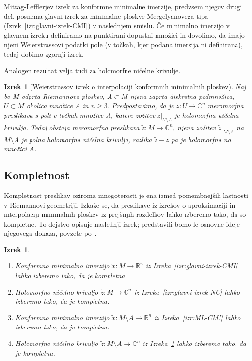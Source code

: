 \documentclass[12pt,a4paper,twoside]{article}
\theoremstyle{definition} %
\theoremstyle{plain} %
\newtheorem{izrek}[definicija]{Izrek}
\numberwithin{equation}{section}  %
\newcommand{\R}{\mathbb R}
\newcommand{\C}{\mathbb C}
\begin{document}
Mittag-Lefflerjev izrek za konformne minimalne imerzije, predvsem njegov drugi del, posnema glavni izrek za minimalne ploskve Mergelyanovega tipa (Izrek~\ref{izr:glavni-izrek-CMI}) v naslednjem smislu. Če minimalno imerzijo v glavnem izreku definiramo na punktirani dopustni množici in dovolimo, da imajo njeni Weierstrassovi podatki pole (v točkah, kjer podana imerzija ni definirana), tedaj dobimo zgornji izrek.

Analogen rezultat velja tudi za holomorfne ničelne krivulje.

\begin{izrek} [Weierstrassov izrek o interpolaciji konformnih minimalnih ploskev] \label{izr:Weierstrass-CMI}
Naj bo $M$ odprta Riemannova ploskev, $A \subset M$ njena zaprta diskretna podmnožica, $U \subset M$ okolica množice $A$ in $n \geq 3$.
Predpostavimo, da je $z \colon U \to \C^{n}$ meromorfna preslikava s poli v točkah množice $A$, katere zožitev $z|_{U \setminus A}$ je holomorfna ničelna krivulja.
Tedaj obstaja meromorfna preslikava $\tilde{z} \colon M \to \C^{n}$, njena zožitev $\tilde{z}|_{M \setminus A}$ na $M \setminus A$ je polna holomorfna ničelna krivulja, razlika $\tilde{z}-z$ pa je holomorfna na množici $A$.
\end{izrek}

\subsection{Kompletnost}
%
Kompletnost preslikav oziroma mnogoterosti je ena izmed pomembnejših lastnosti v Riemannovi geometriji. Izkaže se, da preslikave iz izrekov o aproksimaciji in interpolaciji minimalnih ploskev iz prejšnjih razdelkov lahko izberemo tako, da so kompletne. To dejstvo opisuje naslednji izrek; predstavili bomo le osnovne ideje njegovega dokaza, povzete po~\cite[str.~171--173]{alarcon2021minimal}.

\begin{izrek} \label{izr:kompletnost}
\begin{enumerate}
\item Konformno minimalno imerzijo $\tilde{x} \colon M \to \R^{n}$ iz Izreka~\ref{izr:glavni-izrek-CMI} lahko izberemo tako, da je kompletna.
\item Holomorfno ničelno krivuljo $\tilde{z} \colon M \to \C^{n}$ iz Izreka~\ref{izr:glavni-izrek-NC} lahko izberemo tako, da je kompletna.
\item Konformno minimalno imerzijo $\tilde{x} \colon M \setminus A \to \R^{n}$ iz Izreka~\ref{izr:ML-CMI} lahko izberemo tako, da je kompletna.
\item Holomorfno ničelno krivuljo $\tilde{z} \colon M \setminus A \to \C^{n}$ iz Izreka~\ref{izr:Weierstrass-CMI} lahko izberemo tako, da je kompletna.
\end{enumerate}
\end{izrek}
\end{document}

